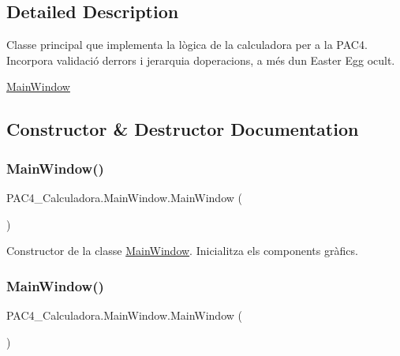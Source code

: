 \subsection{Detailed Description}
Classe principal que implementa la lògica de la calculadora per a la P\+A\+C4. Incorpora validació d\textquotesingle{}errors i jerarquia d\textquotesingle{}operacions, a més d\textquotesingle{}un Easter Egg ocult. 

\mbox{\hyperlink{class_p_a_c4___calculadora_1_1_main_window}{Main\+Window}} 

\subsection{Constructor \& Destructor Documentation}
\mbox{\label{class_p_a_c4___calculadora_1_1_main_window_a3332f70a514dc3489ebb21285d219f04}} 
\subsubsection{\texorpdfstring{Main\+Window()}{MainWindow()}\hspace{0.1cm}{\footnotesize\ttfamily [1/2]}}
{\footnotesize\ttfamily P\+A\+C4\+\_\+\+Calculadora.\+Main\+Window.\+Main\+Window (\begin{DoxyParamCaption}{ }\end{DoxyParamCaption})\hspace{0.3cm}{\ttfamily [inline]}}



Constructor de la classe \mbox{\hyperlink{class_p_a_c4___calculadora_1_1_main_window}{Main\+Window}}. Inicialitza els components gràfics. 

\mbox{\label{class_p_a_c4___calculadora_1_1_main_window_a3332f70a514dc3489ebb21285d219f04}} 
\subsubsection{\texorpdfstring{Main\+Window()}{MainWindow()}\hspace{0.1cm}{\footnotesize\ttfamily [2/2]}}
{\footnotesize\ttfamily P\+A\+C4\+\_\+\+Calculadora.\+Main\+Window.\+Main\+Window (\begin{DoxyParamCaption}{ }\end{DoxyParamCaption})\hspace{0.3cm}{\ttfamily [inline]}}



